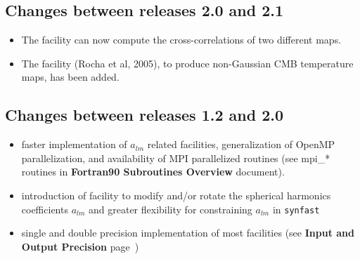 \documentclass[12pt,twoside]{article}
\begin{document}
{{\subsection[Changes between releases 2.0 and 2.1]{Changes between releases 2.0 and
2.1}
\begin{itemize}
\item The  facility can now compute the cross-correlations of two different
maps. 
\item The  facility (Rocha et al, 2005), to produce non-Gaussian CMB temperature maps,
has been added.
\end{itemize}

\subsection[Changes between releases 1.2 and 2.0]{Changes between releases 1.2 and 2.0}
\begin{itemize}
\item faster implementation of $a_{lm}$ related facilities, generalization of
  OpenMP parallelization, and availability of MPI parallelized routines (see
  mpi\_* routines in {\bf Fortran90 Subroutines Overview} document).
\item introduction of  facility to modify and/or rotate the spherical
  harmonics coefficients $a_{lm}$ and greater flexibility for constraining
  $a_{lm}$ in {\tt synfast}
\item single and double precision implementation of most facilities (see {\bf {Input and Output Precision}}
  page~\pageref{page:ioprec})
\end{itemize}
}}%

\newpage
















% 
% 
% 
% 
% 
% 
% 

\newpage

\end{document}
